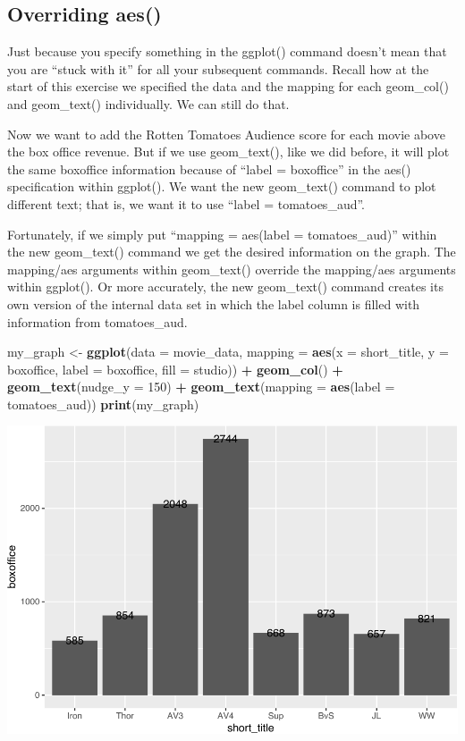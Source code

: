 \documentclass[
]{krantz}
\makeatletter
\newenvironment{Shaded}{\begin{snugshade}}{\end{snugshade}}
\newcommand{\DataTypeTok}[1]{\textcolor[rgb]{0.27,0.27,0.27}{#1}}
\newcommand{\DecValTok}[1]{\textcolor[rgb]{0.06,0.06,0.06}{#1}}
\newcommand{\KeywordTok}[1]{\textcolor[rgb]{0.27,0.27,0.27}{\textbf{#1}}}
\newcommand{\NormalTok}[1]{#1}
\newcommand{\OperatorTok}[1]{\textcolor[rgb]{0.43,0.43,0.43}{\textbf{#1}}}
\newcommand{\StringTok}[1]{\textcolor[rgb]{0.5,0.5,0.5}{#1}}
\newenvironment{kframe}{%
\medskip{}
\setlength{\fboxsep}{.8em}
 \def\at@end@of@kframe{}%
 \ifinner\ifhmode%
  \def\at@end@of@kframe{\end{minipage}}%
  \begin{minipage}{\columnwidth}%
 \fi\fi%
 \def\FrameCommand##1{\hskip\@totalleftmargin \hskip-\fboxsep
 \colorbox{shadecolor}{##1}\hskip-\fboxsep
     \hskip-\linewidth \hskip-\@totalleftmargin \hskip\columnwidth}%
 \MakeFramed {\advance\hsize-\width
   \@totalleftmargin\z@ \linewidth\hsize
   \@setminipage}}%
 {\par\unskip\endMakeFramed%
 \at@end@of@kframe}
\renewenvironment{Shaded}{\begin{kframe}}{\end{kframe}}
\makeatother
\begin{document}
\hypertarget{overriding-aes}{%
\subsection{Overriding aes()}\label{overriding-aes}}

Just because you specify something in the ggplot() command doesn't mean that you are ``stuck with it'' for all your subsequent commands. Recall how at the start of this exercise we specified the data and the mapping for each geom\_col() and geom\_text() individually. We can still do that.

Now we want to add the Rotten Tomatoes Audience score for each movie above the box office revenue. But if we use geom\_text(), like we did before, it will plot the same boxoffice information because of ``label = boxoffice'' in the aes() specification within ggplot(). We want the new geom\_text() command to plot different text; that is, we want it to use ``label = tomatoes\_aud''.

Fortunately, if we simply put ``mapping = aes(label = tomatoes\_aud)'' within the new geom\_text() command we get the desired information on the graph. The mapping/aes arguments within geom\_text() override the mapping/aes arguments within ggplot(). Or more accurately, the new geom\_text() command creates its own version of the internal data set in which the label column is filled with information from tomatoes\_aud.

\begin{Shaded}
\begin{Highlighting}[]
\NormalTok{my_graph <-}\StringTok{ }\KeywordTok{ggplot}\NormalTok{(}\DataTypeTok{data =}\NormalTok{ movie_data,}
           \DataTypeTok{mapping =} \KeywordTok{aes}\NormalTok{(}\DataTypeTok{x =}\NormalTok{ short_title,}
                         \DataTypeTok{y =}\NormalTok{ boxoffice,}
                         \DataTypeTok{label =}\NormalTok{ boxoffice, }
                         \DataTypeTok{fill =}\NormalTok{ studio)) }\OperatorTok{+}
\StringTok{  }\KeywordTok{geom_col}\NormalTok{() }\OperatorTok{+}
\StringTok{  }\KeywordTok{geom_text}\NormalTok{(}\DataTypeTok{nudge_y =} \DecValTok{150}\NormalTok{)  }\OperatorTok{+}
\StringTok{  }\KeywordTok{geom_text}\NormalTok{(}\DataTypeTok{mapping =} \KeywordTok{aes}\NormalTok{(}\DataTypeTok{label =}\NormalTok{ tomatoes_aud)) }
\KeywordTok{print}\NormalTok{(my_graph)}
\end{Highlighting}
\end{Shaded}

\includegraphics[width=0.65\linewidth]{bookdown_files/figure-latex/unnamed-chunk-257-1}
\end{document}

